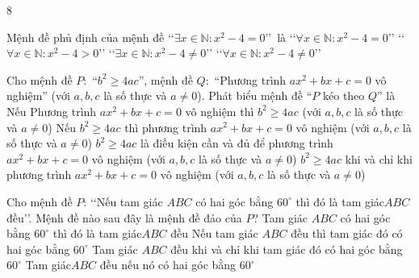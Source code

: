 \begin{indapan}{8}
\begin{ex}
\end{ex}
\begin{ex}%
	Mệnh đề phủ định của mệnh đề \lq \lq $\exists x\in \mathbb{N}\colon x^2-4=0$\rq \rq \ là
	\choice
	{\lq \lq $\forall x\in \mathbb{N}\colon x^2-4=0$\rq \rq }
	{\lq \lq $\forall x\in \mathbb{N}\colon x^2-4>0$\rq \rq }
	{\lq \lq $\exists x\in \mathbb{N}\colon x^2-4\ne 0$\rq \rq }
	{\True \lq \lq $\forall x\in \mathbb{N}\colon x^2-4\ne 0$\rq \rq}
\end{ex}
\begin{ex}%
	Cho mệnh đề $P\colon$ ``$b^2\ge 4ac$'', mệnh đề $Q\colon$ ``Phương trình $ax^2 +bx+c=0$ vô nghiệm'' (với $a,b,c$ là số thực và $a\ne 0$). Phát biểu mệnh đề ``$P$ kéo theo $Q$'' là
	\choice
	{Nếu Phương trình $ax^2 +bx+c=0$ vô nghiệm thì $b^2\ge 4ac$ (với $a,b,c$ là số thực và $a\ne 0$)}
	{\True Nếu $b^2\ge 4ac$ thì phương trình $ax^2 +bx+c=0$ vô nghiệm (với $a,b,c$ là số thực và $a\ne 0$) }
	{$b^2\ge 4ac$ là điều kiện cần và đủ để phương trình $ax^2 +bx+c=0$ vô nghiệm (với $a,b,c$ là số thực và $a\ne 0$)}
	{$b^2\ge 4ac$ khi và chỉ khi phương trình $ax^2 +bx+c=0$ vô nghiệm (với $a,b,c$ là số thực và $a\ne 0$)}
\end{ex}
\begin{ex}%
	Cho mệnh đề $P$: \lq\lq  Nếu tam giác $ABC$ có hai góc bằng $60^{\circ}$ thì đó là tam giác$ABC$ đều\rq\rq. Mệnh đề nào sau đây là mệnh đề đảo của $P$?
	\choice
	{Tam giác $ABC$ có hai góc bằng $60^{\circ}$ thì đó là tam giác$ABC$ đều}
	{\True Nếu tam giác $ABC$ đều thì tam giác đó có hai góc bằng $60^{\circ}$}
	{Tam giác $ABC$ đều khi và chỉ khi tam giác đó có hai góc bằng $60^{\circ}$}
	{Tam giác$ABC$ đều nếu nó có hai góc bằng $60^{\circ}$}
\end{ex}
\begin{ex}%

\end{ex}
\end{indapan}
